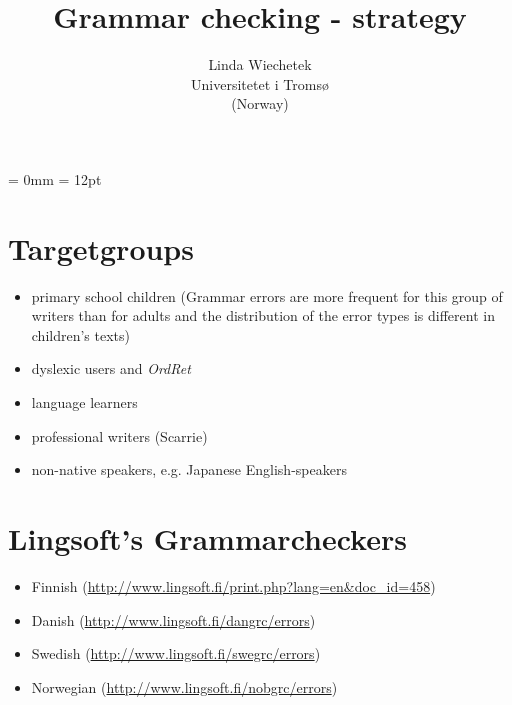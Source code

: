 \documentclass[a4paper,english,12pt]{article}
\begin{document}
\setcounter{secnumdepth}{3}
\setcounter{tocdepth}{3}
\begin{spacing}{1.0}


\newcommand{\tx}{\mbox{t\hspace{-.35em}-}} %
\newcommand{\txx}{\mbox{T\hspace{-.5em}-}} 




\title{{\Large Grammar checking - strategy}}


\author{Linda Wiechetek \\
		Universitetet i Tromsø \\
			(Norway)}
\date{}
\maketitle

\thispagestyle{empty}
\tableofcontents 
\thispagestyle{empty} %

\newpage

\setcounter{page}{1} %

\parindent = 0mm
\parskip = 12pt

\section{Targetgroups}

\begin{itemize}
\item primary school children (Grammar errors are more frequent for this group of writers than for adults and the distribution of the error types is different in children’s texts) \cite{Sofkova2003}
\item dyslexic users \cite{Pedler2007} and \textit{OrdRet}
\item language learners
\item professional writers (Scarrie)
\item non-native speakers, e.g. Japanese English-speakers \cite{}
\end{itemize}


\section{Lingsoft's Grammarcheckers}

\begin{itemize}
\item Finnish (\url{http://www.lingsoft.fi/print.php?lang=en&doc_id=458})
\item Danish (\url{http://www.lingsoft.fi/dangrc/errors})
\item Swedish (\url{http://www.lingsoft.fi/swegrc/errors})
\item Norwegian (\url{http://www.lingsoft.fi/nobgrc/errors})
\end{itemize}


\end{spacing}
\end{document}
